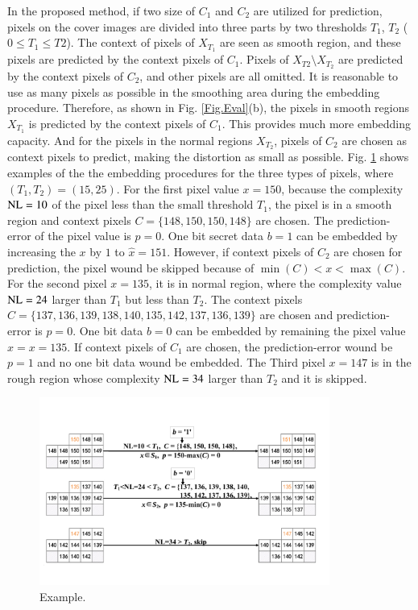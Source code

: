 \documentclass[review,3p,10pt,sort&compress]{elsarticle}
\begin{document}
In the proposed method, if two size of $C_1$ and $C_2$ are utilized for prediction, pixels on the cover images are divided into three parts by two thresholds $T_1$, $T_2$ ($0 \leq T_1 \leq T2$). The context of pixels of $X_{T_1}$ are seen as smooth region, and these pixels are predicted by the context pixels of $C_1$. Pixels of $X_{T2} \setminus X_{T_2}$ are predicted by the context pixels of $C_2$, and other pixels are all omitted. It is reasonable to use as many pixels as possible in the smoothing area during the embedding procedure. Therefore, as shown in Fig. \ref{Fig.Eval}(b), the pixels in smooth regions $X_{T_1}$ is predicted by the context pixels of $C_1$. This provides much more embedding capacity. And for the pixels in the normal regions $X_{T_2}$, pixels of $C_2$ are chosen as context pixels to predict, making the distortion as small as possible. Fig. \ref{Fig.EmbedExample} shows examples of the the embedding procedures for the three types of pixels, where $(T_1, T_2) = (15, 25)$. For the first pixel value $x = 150$, because the complexity ${\rm NL} = 10$ of the pixel less than the small threshold $T_1$, the pixel is in a smooth region and context pixels $C = \{148, 150, 150, 148\}$ are chosen. The prediction-error of the pixel value is $p = 0$. One bit secret data $b = 1$ can be embedded by increasing the $x$ by $1$ to $\hat{x} = 151$. However, if context pixels of $C_2$ are chosen for prediction, the pixel wound be skipped because of $\min(C) < x < \max(C)$. For the second pixel $x = 135$, it is in normal region, where the complexity value ${\rm NL} = 24$ larger than $T_1$ but less than $T_2$. The context pixels $C = \{137, 136, 139, 138, 140, 135, 142, 137, 136, 139\}$ are chosen and prediction-error is $p = 0$. One bit data $b = 0$ can be embedded by remaining the pixel value $\hat{x} = x = 135$. If context pixels of $C_1$ are chosen, the prediction-error wound be $p = 1$ and no one bit data wound be embedded. The Third pixel $x = 147$ is in the rough region whose complexity ${\rm NL} = 34$ larger than $T_2$ and it is skipped.
\begin{figure}
\centering
\includegraphics[width=0.85\textwidth]{figures/EmbedwithTh.pdf}
\centering
\caption{Example.}
\label{Fig.EmbedExample}
\end{figure}
\end{document}
